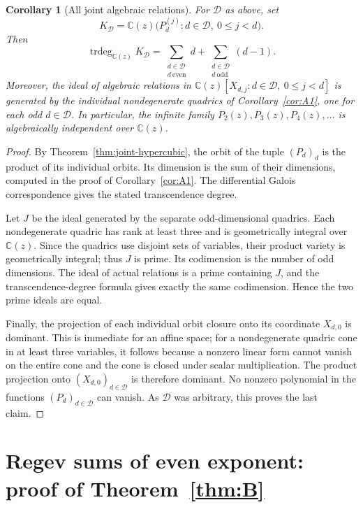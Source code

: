 \documentclass[11pt]{amsart}
\newtheorem{corollary}[thm]{Corollary}
\theoremstyle{definition}
\newcommand{\C}{\mathbb C}
\begin{document}
\begin{corollary}[All joint algebraic relations]\label{cor:joint-relations}
For $\mathcal D$ as above, set
\[
 K_{\mathcal D}=\C(z)\bigl(P_d^{(j)}:
                    d\in\mathcal D,\ 0\le j<d\bigr).
\]
Then
\[
 \operatorname{trdeg}_{\C(z)}K_{\mathcal D}
 =\sum_{\substack{d\in\mathcal D\\d\ \mathrm{even}}}d
  +\sum_{\substack{d\in\mathcal D\\d\ \mathrm{odd}}}(d-1).
\]
Moreover, the ideal of algebraic relations in
$\C(z)[X_{d,j}:d\in\mathcal D,\ 0\le j<d]$ is generated by the
individual nondegenerate quadrics of Corollary~\ref{cor:A1}, one for
each odd $d\in\mathcal D$.  In particular, the infinite family
$P_2(z),P_3(z),P_4(z),\ldots$ is algebraically independent over $\C(z)$.
\end{corollary}
\begin{proof}
By Theorem~\ref{thm:joint-hypercubic}, the orbit of the tuple $(P_d)_d$
is the product of its individual orbits.  Its dimension is the sum
of their dimensions, computed in the proof of
Corollary~\ref{cor:A1}.  The differential Galois correspondence gives
the stated transcendence degree.

Let $J$ be the ideal generated by the separate odd-dimensional
quadrics.  Each nondegenerate quadric has rank at least three and is
geometrically integral over $\C(z)$.  Since the quadrics use disjoint
sets of variables, their product variety is geometrically integral;
thus $J$ is prime.  Its codimension is the number of odd dimensions.
The ideal of actual relations is a prime containing $J$, and the
transcendence-degree formula gives exactly the same codimension.
Hence the two prime ideals are equal.

Finally, the projection of each individual orbit closure onto its
coordinate $X_{d,0}$ is dominant.  This is immediate for an affine
space; for a nondegenerate quadric cone in at least three variables,
it follows because a nonzero linear form cannot vanish on the entire
cone and the cone is closed under scalar multiplication.
The product projection onto $(X_{d,0})_{d\in\mathcal D}$ is therefore
dominant.  No nonzero polynomial in the functions $(P_d)_{d\in\mathcal D}$
can vanish.  As $\mathcal D$ was arbitrary, this proves the last claim.
\end{proof}

\section{Regev sums of even exponent: proof of \texorpdfstring{Theorem~\ref{thm:B}}{Theorem B}}\label{sec:B}
\end{document}
